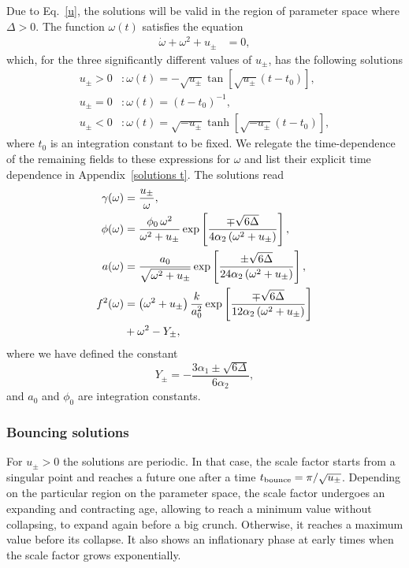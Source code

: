 \documentclass[aps,prd,12pt,superscriptaddress,showpacs,showkeys,longbibliography,reprint,nofootinbib]{revtex4-1}
\begin{document}
Due to Eq.~\eqref{u}, the solutions will be valid in the region of parameter space where $\Delta>0$. The function $\omega(t)$ satisfies the equation
\begin{align}
\dot{\omega}+\omega^2+u_{\pm} &= 0,
\end{align}
which, for the three significantly different values of $u_\pm$, has the following solutions
\begin{align}
  u_\pm>0&:\omega(t)=-\sqrt{u_\pm}\tan\left[\sqrt{u_\pm}\left(t-t_0\right)\right],\\
  u_\pm=0&:\omega(t)=\left(t-t_0\right)^{-1},\\
  u_\pm<0&:\omega(t)=\sqrt{-u_\pm}\tanh\left[\sqrt{-u_\pm}\left(t-t_0\right)\right],
\end{align}
where $t_0$ is an integration constant to be fixed. We relegate the time-dependence of the remaining fields to these expressions for $\omega$ and list their explicit time dependence in Appendix~\ref{solutions t}. The solutions read
\begin{align}
  \gamma(\omega)&=\frac{u_\pm}{\omega},\\
  \phi(\omega)&=\frac{\phi_0\,\omega^2}{\omega^2+u_\pm}\exp\left[\frac{\mp\sqrt{6\Delta}}{4\alpha_2\left(\omega^2+u_\pm\right)}\right],\\
  a(\omega)&=\frac{a_0}{\sqrt{\omega^2+u_\pm}}\exp\left[\frac{\pm\sqrt{6\Delta}} {24\alpha_2\left(\omega^2+u_\pm\right)}\right],\\
  f^2(\omega)&=\left(\omega^2+u_\pm\right)\frac{k}{a_0^2}\exp\left[\frac{\mp\sqrt{6\Delta}}{12\alpha_2\left(\omega^2+u_\pm\right)}\right]\notag\\
  &+\omega^2-Y_\pm,
\end{align}
where we have defined the constant
\begin{equation*}
  Y_{\pm} = -\frac{3\alpha_1\pm\sqrt{6\Delta}}{6\alpha_2},
\end{equation*}
and $a_0$ and $\phi_0$ are integration constants.

\subsubsection{Bouncing solutions}

For $u_\pm>0$ the solutions are periodic. In that case, the scale factor starts from a singular point and reaches a future one after a time $t_{\rm bounce}=\pi/\sqrt{u_\pm}$. Depending on the particular region on the parameter space, the scale factor undergoes an expanding and contracting age, allowing to reach a minimum value without collapsing, to expand again before a big crunch. Otherwise, it reaches a maximum value before its collapse. It also shows an inflationary phase at early times when the scale factor grows exponentially.
\end{document}
